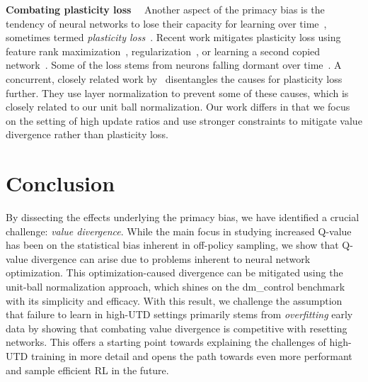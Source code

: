 {\bf Combating plasticity loss}~~ Another aspect of the primacy bias is the tendency of neural networks to lose their capacity for learning over time~\parencite{igl2021transient}, sometimes termed \emph{plasticity loss}~\parencite{lyle2022understanding, abbas2023loss}. Recent work mitigates plasticity loss using feature rank maximization~\parencite{kumar2021implicit}, regularization~\parencite{lyle2023understanding}, or learning a second copied network~\parencite{nikishin2024deep}. Some of the loss stems from neurons falling dormant over time~\parencite{sokar2023dormant}. A concurrent, closely related work by~\textcite{lyle2024disentangling} disentangles the causes for plasticity loss further. They use layer normalization to prevent some of these causes, which is closely related to our unit ball normalization. Our work differs in that we focus on the setting of high update ratios and use stronger constraints to mitigate value divergence rather than plasticity loss. 


\section{Conclusion}

By dissecting the effects underlying the primacy bias, we have identified a crucial challenge: \emph{value divergence}. 
While the main focus in studying increased Q-value has been on the statistical bias inherent in off-policy sampling, we show that Q-value divergence can arise due to problems inherent to neural network optimization.
This optimization-caused divergence can be mitigated using the unit-ball normalization approach, which shines on the \textsf{dm\_control} benchmark with its simplicity and efficacy. 
With this result, we challenge the assumption that failure to learn in high-UTD settings primarily stems from \emph{overfitting} early data by showing that combating value divergence is competitive with resetting networks. 
This offers a starting point towards explaining the challenges of high-UTD training in more detail and opens the path towards even more performant and sample efficient RL in the future.

